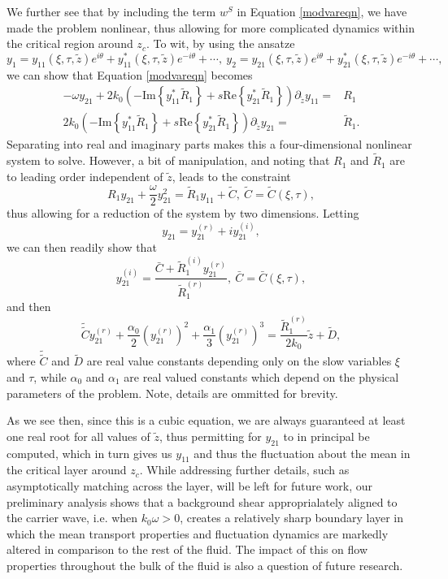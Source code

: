 \documentclass{JFM_Style/jfm}
\newcommand{\pd}{\partial}
\begin{document}
 We further see that by including the term $w^{S}$ in Equation \eqref{modvareqn}, we have made the problem nonlinear, thus allowing for more complicated dynamics within the critical region around $z_{c}$.  To wit, by using the ansatze 
 \[
 y_{1} = y_{11}(\xi,\tau,\tilde{z})e^{i\theta} + y_{11}^{\ast}(\xi,\tau,\tilde{z})e^{-i\theta} + \cdots, ~  y_{2} = y_{21}(\xi,\tau,\tilde{z})e^{i\theta} + y_{21}^{\ast}(\xi,\tau,\tilde{z})e^{-i\theta} + \cdots,
 \]
 we can show that Equation \eqref{modvareqn} becomes 
 \begin{align*}
 -\omega y_{21} + 2k_{0}\left(-\mbox{Im}\left\{y_{11}^{\ast}\tilde{R}_{1}\right\}+s\mbox{Re}\left\{y_{21}^{\ast}\tilde{R}_{1}\right\}\right)\pd_{\tilde{z}}y_{11} = & R_{1}\\
2k_{0}\left(-\mbox{Im}\left\{y_{11}^{\ast}\tilde{R}_{1}\right\}+s\mbox{Re}\left\{y_{21}^{\ast}\tilde{R}_{1}\right\}\right)\pd_{\tilde{z}}y_{21} = & \tilde{R}_{1}.
 \end{align*}
 Separating into real and imaginary parts makes this a four-dimensional nonlinear system to solve.  However, a bit of manipulation, and noting that $R_{1}$ and $\tilde{R}_{1}$ are to leading order independent of $\tilde{z}$, leads to the constraint
 \[
 R_{1}y_{21} + \frac{\omega}{2}y_{21}^{2} = \tilde{R}_{1}y_{11} + \tilde{C}, ~ \tilde{C} = \tilde{C}(\xi,\tau),
 \]
 thus allowing for a reduction of the system by two dimensions.  Letting 
 \[
 y_{21} = y_{21}^{(r)} + i y_{21}^{(i)},
 \]
 we can then readily show that 
 \[
 y^{(i)}_{21} = \frac{\bar{C} + \tilde{R}_{1}^{(i)}y_{21}^{(r)}}{\tilde{R}_{1}^{(r)}}, ~ \bar{C} = \bar{C}(\xi,\tau),
 \]
 and then 
 \[
 \tilde{\tilde{C}} y_{21}^{(r)} + \frac{\alpha_{0}}{2}\left(y_{21}^{(r)}\right)^{2} + \frac{\alpha_{1}}{3}\left(y_{21}^{(r)}\right)^{3} = \frac{\tilde{R}_{1}^{(r)}}{2k_{0}}\tilde{z} + \tilde{D},
 \]
where $\tilde{\tilde{C}}$ and $\tilde{D}$ are real value constants depending only on the slow variables $\xi$ and $\tau$, while $\alpha_{0}$ and $\alpha_{1}$ are real valued constants which depend on the physical parameters of the problem.  Note, details are ommitted for brevity.  

As we see then, since this is a cubic equation, we are always guaranteed at least one real root for all values of $\tilde{z}$, thus permitting for $y_{21}$ to in principal be computed, which in turn gives us $y_{11}$ and thus the fluctuation about the mean in the critical layer around $z_{c}$.  While addressing further details, such as asymptotically matching across the layer, will be left for future work, our preliminary analysis shows that a background shear approprialately aligned to the carrier wave, i.e. when $k_{0}\omega >0$, creates a relatively sharp boundary layer in which the mean transport properties and fluctuation dynamics are markedly altered in comparison to the rest of the fluid.  The impact of this on flow properties throughout the bulk of the fluid is also a question of future research. 
\end{document}
